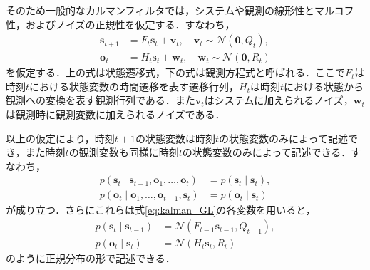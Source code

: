         そのため一般的なカルマンフィルタでは，システムや観測の線形性とマルコフ性，およびノイズの正規性を仮定する．すなわち，
        \begin{equation}
            \label{eq:kalman_GL}
            \begin{aligned}
                \bm{s}_{t+1} &= F_t \bm{s}_t + \bm{v}_t, \quad \bm{v}_t \sim \mathcal{N}(\bm{0}, Q_t),
                \\ \bm{o}_t &= H_t \bm{s}_t + \bm{w}_t, \quad \bm{w}_t \sim \mathcal{N}(\bm{0}, R_t)
            \end{aligned}        
        \end{equation}
        を仮定する．上の式は状態遷移式，下の式は観測方程式と呼ばれる．ここで$F_t$は時刻$t$における状態変数の時間遷移を表す遷移行列，$H_t$は時刻$t$における状態から観測への変換を表す観測行列である．また$\bm{v}_t$はシステムに加えられるノイズ，$\bm{w}_t$は観測時に観測変数に加えられるノイズである．

        以上の仮定により，時刻$t+1$の状態変数は時刻$t$の状態変数のみによって記述でき，また時刻$t$の観測変数も同様に時刻$t$の状態変数のみによって記述できる．すなわち，
        \begin{equation}
            \label{eq:kalman_with_markov}
            \begin{aligned}
                p(\bm{s}_{t} \mid \bm{s}_{t-1}, \bm{o}_1, \dots, \bm{o}_t) &= p(\bm{s}_t \mid \bm{s}_t),
                \\p(\bm{o}_t \mid \bm{o}_1, \dots, \bm{o}_{t-1}, \bm{s}_t) &= p(\bm{o}_t \mid \bm{s}_t)
            \end{aligned}
        \end{equation}
        が成り立つ．さらにこれらは式\ref{eq:kalman_GL}の各変数を用いると，
        \begin{equation}
            \label{eq:linear_transition_and_observation}
            \begin{aligned}
                p(\bm{s}_t \mid \bm{s}_{t-1}) &= \mathcal{N}(F_{t-1} \bm{s}_{t-1}, Q_{t-1}),
                \\ p(\bm{o}_t \mid \bm{s}_t) &= \mathcal{N}(H_t \bm{s}_{t}, R_t)
            \end{aligned}
        \end{equation}
        のように正規分布の形で記述できる．

